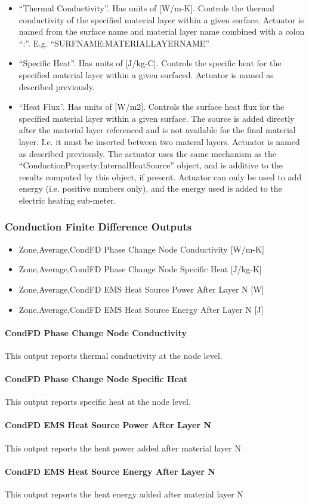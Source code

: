 \begin{itemize}
    \item ``Thermal Conductivity''. Has units of [W/m-K]. Controls the thermal conductivity of the specified material layer within a given surface. Actuator is named from the surface name and material layer name combined with a colon ``:''. E.g. ``SURFNAME:MATERIALLAYERNAME''
    \item ``Specific Heat''. Has units of [J/kg-C]. Controls the specific heat for the specified material layer within a given surfaced. Actuator is named as described previously.
    \item ``Heat Flux''. Has units of [W/m2]. Controls the surface heat flux for the specified material layer within a given surface. The source is added directly after the material layer referenced and is not available for the final material layer. I.e. it must be inserted between two materal layers. Actuator is named as described previously. The actuator uses the same mechanism as the ``ConductionProperty:InternalHeatSource'' object, and is additive to the results computed by this object, if present. Actuator can only be used to add energy (i.e. positive numbers only), and the energy used is added to the electric heating sub-meter.
\end{itemize}

\subsubsection{Conduction Finite Difference Outputs}

\begin{itemize}
  \item Zone,Average,CondFD Phase Change Node Conductivity [W/m-K]
  \item Zone,Average,CondFD Phase Change Node Specific Heat [J/kg-K]
  \item Zone,Average,CondFD EMS Heat Source Power After Layer N [W]
  \item Zone,Average,CondFD EMS Heat Source Energy After Layer N [J]
\end{itemize}

\paragraph{CondFD Phase Change Node Conductivity}

This output reports thermal conductivity at the node level.

\paragraph{CondFD Phase Change Node Specific Heat}

This output reports specific heat at the node level.

\paragraph{CondFD EMS Heat Source Power After Layer N}

This output reports the heat power added after material layer N

\paragraph{CondFD EMS Heat Source Energy After Layer N}

This output reports the heat energy added after material layer N
